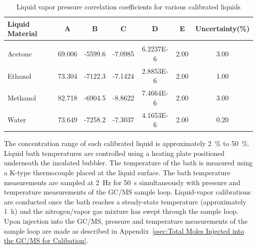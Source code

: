\documentclass[12pt]{article}
\begin{document}
\begin{table}[!]
\caption{Liquid vapor pressure correlation coefficients for various calibrated liquids}
\label{tab:Liquid Calibrate_Table}
\centering
	\footnotesize
	\begin{tabular}{lcccccc}
			\hline
\textbf{Liquid Material} &\textbf{A}& \textbf{B}& \textbf{C}&\textbf{D}&\textbf{E}&\textbf{Uncertainty(\%)}\\
\hline
\\[0.001cm]
Acetone	&	69.006	&	-5599.6	&	-7.0985	&	6.2237E-6	& 	2.00	&  3.00\\
Ethanol	&	73.304	&	-7122.3	&	-7.1424	&	2.8853E-6	& 	2.00	&  1.00\\
Methanol	&	82.718	&	-6904.5	&	-8.8622	&	7.4664E-6	& 	2.00	&  3.00\\
Water		&	73.649	&	-7258.2	&	-7.3037	&	4.1653E-6	& 	2.00	&  0.20\\
\hline
\end{tabular}
\end{table}

The concentration range of each calibrated liquid is approximately 2~\% to 50~\%. Liquid bath temperatures are controlled using a heating plate positioned underneath the insulated bubbler. The temperature of the bath is measured using a K-type thermocouple placed at the liquid surface. The bath temperature measurements are sampled at \SI{2}{\hertz} for \SI{50}{s} simultaneously with pressure and temperature measurements of the GC/MS sample loop. Liquid-vapor calibrations are conducted once the bath reaches a steady-state temperature (approximately 1~h) and the nitrogen/vapor gas mixture has swept through the sample loop. Upon injection into the GC/MS, pressure and temperature measurements of the sample loop are made as described in Appendix~\ref{ssec:Total Moles Injected into the GC/MS for Calibation}.
\end{document}
